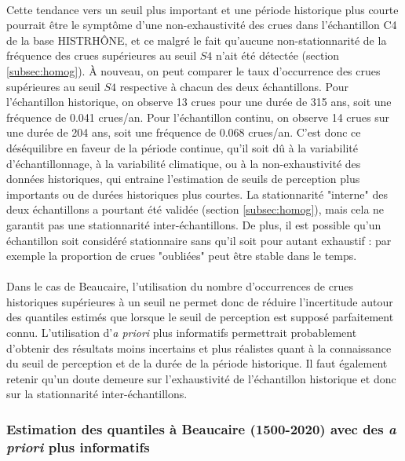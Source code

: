 	\paragraph{} Cette tendance vers un seuil plus important et une période historique plus courte pourrait être le symptôme d'une non-exhaustivité des crues dans l'échantillon C4 de la base HISTRHÔNE, et ce malgré le fait qu'aucune non-stationnarité de la fréquence des crues supérieures au seuil $S4$ n'ait été détectée (section \ref{subsec:homog}). À nouveau, on peut comparer le taux d'occurrence des crues supérieures au seuil $S4$ respective à chacun des deux échantillons. Pour l'échantillon historique, on observe 13 crues pour une durée de 315 ans, soit une fréquence de 0.041 crues/an. Pour l'échantillon continu, on observe 14 crues sur une durée de 204 ans, soit une fréquence de 0.068 crues/an. C'est donc ce déséquilibre en faveur de la période continue, qu'il soit dû à la variabilité d'échantillonnage, à la variabilité climatique, ou à la non-exhaustivité des données historiques, qui entraine l'estimation de seuils de perception plus importants ou de durées historiques plus courtes. La stationnarité "interne" des deux échantillons a pourtant été validée (section \ref{subsec:homog}), mais cela ne garantit pas une stationnarité inter-échantillons. De plus, il est possible qu'un échantillon soit considéré stationnaire sans qu'il soit pour autant exhaustif : par exemple la proportion de crues "oubliées" peut être stable dans le temps.
	
	
	\paragraph{} Dans le cas de Beaucaire, l'utilisation du nombre d'occurrences de crues historiques supérieures à un seuil ne permet donc de réduire l'incertitude autour des quantiles estimés que lorsque le seuil de perception est supposé parfaitement connu. L'utilisation d'\textit{a priori} plus informatifs permettrait probablement d'obtenir des résultats moins incertains et plus réalistes quant à la connaissance du seuil de perception et de la durée de la période historique. Il faut également retenir qu'un doute demeure sur l'exhaustivité de l'échantillon historique et donc sur la stationnarité inter-échantillons.
	 
	 \subsubsection{Estimation des quantiles à Beaucaire (1500-2020) avec des \textit{a priori} plus informatifs}
	 \label{subsec:D*}

